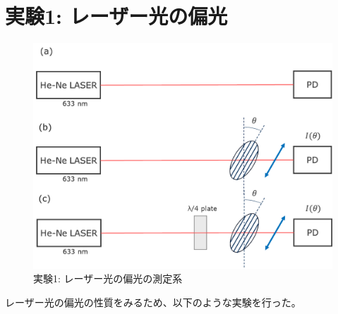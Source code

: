 \documentclass[9pt,dvipdfmx,a4paper]{jsarticle}
\begin{document}


\section{実験1: レーザー光の偏光}
\begin{figure}
    \centering
    \includegraphics[width=0.48\columnwidth]{fig_ex-1.png}
    \caption{実験1: レーザー光の偏光の測定系}
    \label{fig:ex-1}
\end{figure}
レーザー光の偏光の性質をみるため、以下のような実験を行った。
\end{document}
